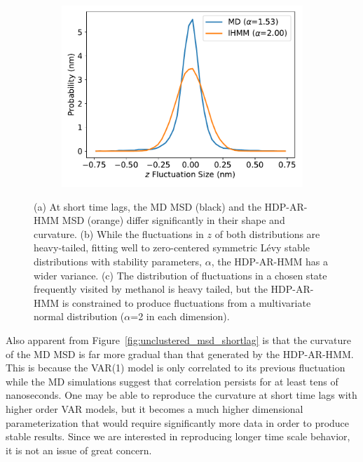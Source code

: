 \documentclass{article}
\begin{document}
\begin{figure}[h]
\begin{subfigure}{0.32\textwidth}
  \includegraphics[width=\textwidth]{state_emission_widths.pdf}
  \caption{}\label{fig:state_emission_widths}
  \end{subfigure}
  \caption{(a) At short time lags, the MD MSD (black) and the HDP-AR-HMM MSD (orange)
  differ significantly in their shape and curvature. (b) While the 
  fluctuations in $z$ of both distributions are heavy-tailed, fitting well to zero-centered
  symmetric L\'evy stable distributions with stability parameters, $\alpha$, the HDP-AR-HMM has
  a wider variance. (c) The distribution of fluctuations in a chosen state frequently
  visited by methanol is heavy tailed, but the HDP-AR-HMM is constrained to produce fluctuations
  from a multivariate normal distribution ($\alpha$=2 in each dimension).
  }\label{fig:short_timelags}
  \end{figure}
  
  Also apparent from Figure~\ref{fig:unclustered_msd_shortlag} is that the 
  curvature of the MD MSD is far more gradual than that generated by the HDP-AR-HMM.
  This is because the VAR(1) model is only correlated to its previous fluctuation
  while the MD simulations suggest that correlation persists for at least tens
  of nanoseconds.
  One may be able to reproduce the curvature at short time lags with higher order
  VAR models, but it becomes a much higher dimensional parameterization that would
  require significantly more data in order to produce stable results. Since we 
  are interested in reproducing longer time scale behavior, it is not an issue of
  great concern.
  
\end{document}

